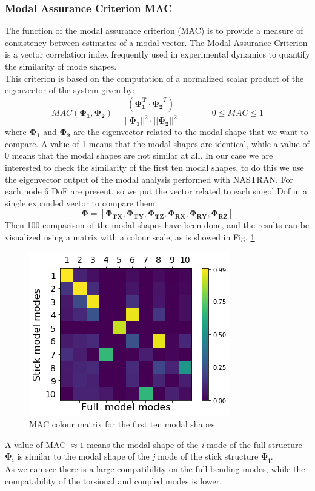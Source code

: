 \subsubsection{Modal Assurance Criterion MAC}
The function of the modal assurance criterion (MAC) is to provide a measure of consistency between estimates of a modal vector. \cite{mac2} The Modal Assurance Criterion is a vector correlation index frequently used in experimental dynamics to quantify the similarity of mode shapes\cite{mac}.\\
This criterion is based on the computation of a normalized scalar product of the eigenvector of the system given by:
\begin{equation*}
MAC(\mathbf{\Phi_1},\mathbf{\Phi_2})=\frac{(\mathbf{\Phi_1^T}\cdot \mathbf{\Phi_2}^T)}{||\mathbf{\Phi_1}||^2\cdot||\mathbf{\Phi_2}||^2} \qquad \qquad 0\le MAC \le 1
\end{equation*}
where $\mathbf{\Phi_1}$ and $\mathbf{\Phi_2}$ are the eigenvector related to the modal shape that we want to compare. A value of 1 means that the modal shapes are identical, while a value of 0 means that the modal shapes are not similar at all. In our case we are interested to check the similarity of the first ten modal shapes, to do this we use the eigenvector output of the modal analysis performed with NASTRAN. For each node 6 DoF are present, so we put the vector related to each singol Dof in a single expanded vector to compare them:
\begin{equation*}
\mathbf{\Phi}=[\mathbf{\Phi_{TX}},\mathbf{\Phi_{TY}},\mathbf{\Phi_{TZ}},\mathbf{\Phi_{RX}},\mathbf{\Phi_{RY}},\mathbf{\Phi_{RZ}}]
\end{equation*}
Then 100 comparison of the modal shapes have been done, and the results can be visualized using a matrix with a colour scale, as is showed in Fig. \ref{fig:4_8}.
\begin{figure}[H]
	\centering
	\includegraphics[width = .8\textwidth]{./Immagini/4_13.png}
	\caption{MAC colour matrix for the first ten modal shapes}
	\label{fig:4_8}
\end{figure}
A value of MAC $\approx 1$ means the modal shape of the \textit{i} mode of the full structure $\mathbf{\Phi_i}$  is similar to the modal shape of the \textit{j} mode of the stick structure $\mathbf{\Phi_j}$. \\
As we can see there is a large compatibility on the full bending modes, while the compatability of the torsional and coupled modes is lower.
